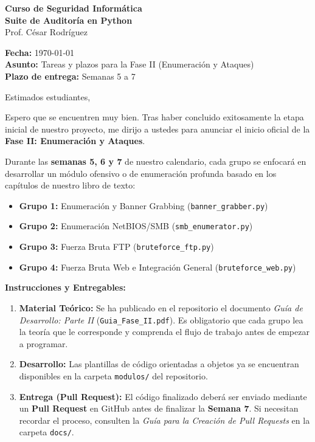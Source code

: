 \documentclass[12pt,letterpaper]{article}
\begin{document}
\begin{center}
    \Large \textbf{Curso de Seguridad Informática} \\
    \large \textbf{Suite de Auditoría en Python} \\
    \vspace{0.3cm}
    \normalsize Prof. César Rodríguez \\
\end{center}

\vspace{0.5cm}

\noindent \textbf{Fecha:} \today \\
\textbf{Asunto:} Tareas y plazos para la Fase II (Enumeración y Ataques) \\
\textbf{Plazo de entrega:} Semanas 5 a 7

\vspace{0.5cm}

\noindent Estimados estudiantes,

\vspace{0.3cm}

Espero que se encuentren muy bien. Tras haber concluido exitosamente la etapa inicial de nuestro proyecto, me dirijo a ustedes para anunciar el inicio oficial de la \textbf{Fase II: Enumeración y Ataques}. 

Durante las \textbf{semanas 5, 6 y 7} de nuestro calendario, cada grupo se enfocará en desarrollar un módulo ofensivo o de enumeración profunda basado en los capítulos de nuestro libro de texto:

\begin{itemize}
    \item \textbf{Grupo 1:} Enumeración y Banner Grabbing (\texttt{banner\_grabber.py})
    \item \textbf{Grupo 2:} Enumeración NetBIOS/SMB (\texttt{smb\_enumerator.py})
    \item \textbf{Grupo 3:} Fuerza Bruta FTP (\texttt{bruteforce\_ftp.py})
    \item \textbf{Grupo 4:} Fuerza Bruta Web e Integración General (\texttt{bruteforce\_web.py})
\end{itemize}

\vspace{0.3cm}
\noindent \textbf{Instrucciones y Entregables:}
\begin{enumerate}
    \item \textbf{Material Teórico:} Se ha publicado en el repositorio el documento \textit{Guía de Desarrollo: Parte II} (\texttt{Guia\_Fase\_II.pdf}). Es obligatorio que cada grupo lea la teoría que le corresponde y comprenda el flujo de trabajo antes de empezar a programar.
    \item \textbf{Desarrollo:} Las plantillas de código orientadas a objetos ya se encuentran disponibles en la carpeta \texttt{modulos/} del repositorio. 
    \item \textbf{Entrega (Pull Request):} El código finalizado deberá ser enviado mediante un \textbf{Pull Request} en GitHub antes de finalizar la \textbf{Semana 7}. Si necesitan recordar el proceso, consulten la \textit{Guía para la Creación de Pull Requests} en la carpeta \texttt{docs/}.
\end{enumerate}
\end{document}
